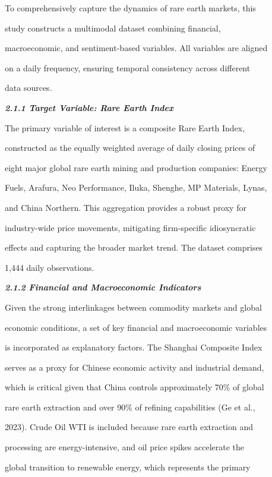 To comprehensively capture the dynamics of rare earth markets, this

study constructs a multimodal dataset combining financial,

macroeconomic, and sentiment-based variables. All variables are aligned

on a daily frequency, ensuring temporal consistency across different

data sources.



\emph{\textbf{2.1.1 Target Variable: Rare Earth Index}}



The primary variable of interest is a composite Rare Earth Index,

constructed as the equally weighted average of daily closing prices of

eight major global rare earth mining and production companies: Energy

Fuels, Arafura, Neo Performance, Iluka, Shenghe, MP Materials, Lynas,

and China Northern. This aggregation provides a robust proxy for

industry-wide price movements, mitigating firm-specific idiosyncratic

effects and capturing the broader market trend. The dataset comprises

1,444 daily observations.



\emph{\textbf{2.1.2 Financial and Macroeconomic Indicators}}



Given the strong interlinkages between commodity markets and global

economic conditions, a set of key financial and macroeconomic variables

is incorporated as explanatory factors. The Shanghai Composite Index

serves as a proxy for Chinese economic activity and industrial demand,

which is critical given that China controls approximately 70\% of global

rare earth extraction and over 90\% of refining capabilities (Ge et al.,

2023). Crude Oil WTI is included because rare earth extraction and

processing are energy-intensive, and oil price spikes accelerate the

global transition to renewable energy, which represents the primary

